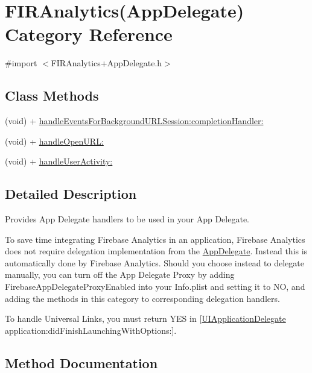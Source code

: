 \hypertarget{category_f_i_r_analytics_07_app_delegate_08}{}\section{F\+I\+R\+Analytics(App\+Delegate) Category Reference}
\label{category_f_i_r_analytics_07_app_delegate_08}


{\ttfamily \#import $<$F\+I\+R\+Analytics+\+App\+Delegate.\+h$>$}

\subsection*{Class Methods}
\begin{DoxyCompactItemize}
\item 
(void) + \hyperlink{category_f_i_r_analytics_07_app_delegate_08_a4d94b911e4b619ea2540942ed3b5c595}{handle\+Events\+For\+Background\+U\+R\+L\+Session\+:completion\+Handler\+:}
\item 
(void) + \hyperlink{category_f_i_r_analytics_07_app_delegate_08_a2c64690b7c4aa50fc5ac5ae81c2de9bc}{handle\+Open\+U\+R\+L\+:}
\item 
(void) + \hyperlink{category_f_i_r_analytics_07_app_delegate_08_a95b43780df1ead5681f612f3a93b5197}{handle\+User\+Activity\+:}
\end{DoxyCompactItemize}


\subsection{Detailed Description}
Provides App Delegate handlers to be used in your App Delegate.

To save time integrating Firebase Analytics in an application, Firebase Analytics does not require delegation implementation from the \hyperlink{interface_app_delegate}{App\+Delegate}. Instead this is automatically done by Firebase Analytics. Should you choose instead to delegate manually, you can turn off the App Delegate Proxy by adding Firebase\+App\+Delegate\+Proxy\+Enabled into your Info.\+plist and setting it to N\+O, and adding the methods in this category to corresponding delegation handlers.

To handle Universal Links, you must return Y\+E\+S in \mbox{[}\hyperlink{class_u_i_application_delegate-p}{U\+I\+Application\+Delegate} application\+:did\+Finish\+Launching\+With\+Options\+:\mbox{]}. 

\subsection{Method Documentation}
\hypertarget{category_f_i_r_analytics_07_app_delegate_08_a4d94b911e4b619ea2540942ed3b5c595}{}
